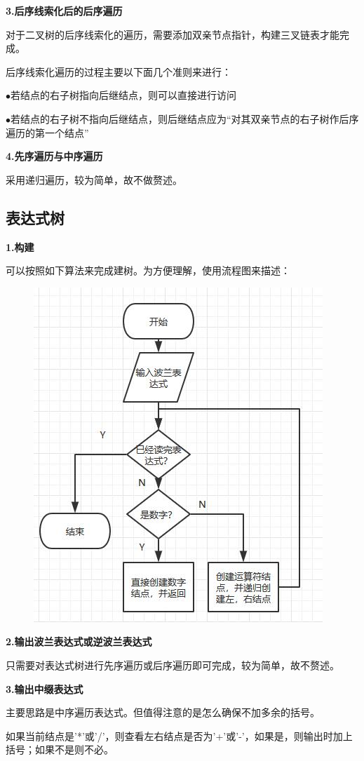 \documentclass[UTF8]{article}
\begin{document}
	\textbf{3.后序线索化后的后序遍历}\par
	对于二叉树的后序线索化的遍历，需要添加双亲节点指针，构建三叉链表才能完成。\par
	后序线索化遍历的过程主要以下面几个准则来进行：\par
	$\bullet$若结点的右子树指向后继结点，则可以直接进行访问\par
	$\bullet$若结点的右子树不指向后继结点，则后继结点应为“对其双亲节点的右子树作后序遍历的第一个结点”\par
	
	\textbf{4.先序遍历与中序遍历}\par
	采用递归遍历，较为简单，故不做赘述。\par
	
	
	\subsection{表达式树}
	\textbf{1.构建}\par
	可以按照如下算法来完成建树。为方便理解，使用流程图来描述：\par
	\begin{figure}[H]
		\centering
		\includegraphics[width=0.6\linewidth]{process2.jpg}
		\label{process2}
	\end{figure}\par
	
	\textbf{2.输出波兰表达式或逆波兰表达式}\par
	只需要对表达式树进行先序遍历或后序遍历即可完成，较为简单，故不赘述。\par
	
	\textbf{3.输出中缀表达式}\par
	主要思路是中序遍历表达式。但值得注意的是怎么确保不加多余的括号。\par
	如果当前结点是'*'或'/'，则查看左右结点是否为'+'或'-'，如果是，则输出时加上括号；如果不是则不必。\par
	
\end{document}
